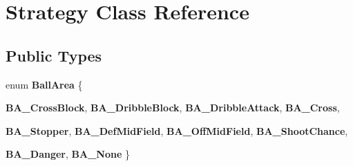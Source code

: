 \hypertarget{classStrategy}{
\section{Strategy Class Reference}
\label{classStrategy}
}
\subsection*{Public Types}
\begin{DoxyCompactItemize}
\item 
enum {\bfseries BallArea} \{ \par
{\bfseries BA\_\-CrossBlock}, 
{\bfseries BA\_\-DribbleBlock}, 
{\bfseries BA\_\-DribbleAttack}, 
{\bfseries BA\_\-Cross}, 
\par
{\bfseries BA\_\-Stopper}, 
{\bfseries BA\_\-DefMidField}, 
{\bfseries BA\_\-OffMidField}, 
{\bfseries BA\_\-ShootChance}, 
\par
{\bfseries BA\_\-Danger}, 
{\bfseries BA\_\-None}
 \}
\end{DoxyCompactItemize}
